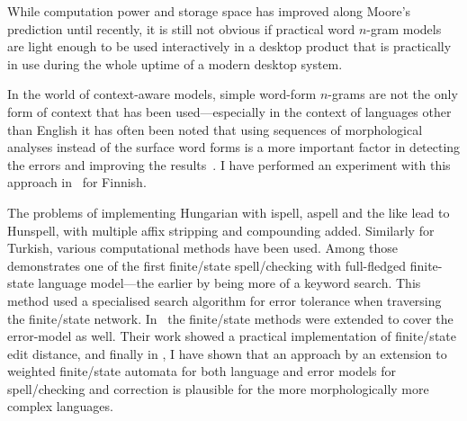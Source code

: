 \documentclass[officiallayout]{unihelcompling}
\begin{document}
While computation power and storage space has improved along Moore's
prediction until recently, it is still not obvious if practical word \(n\)-gram
models are light enough to be used interactively in a desktop product that is
practically in use during the whole uptime of a modern desktop system.

In the world of context-aware models, simple word-form \(n\)-grams are not the only
form of context that has been used---especially in the context of languages
other than English it has often been noted that using sequences of
morphological analyses instead of the surface word forms is a more important
factor in detecting the errors and improving the results~\citet[for
Spanish]{otero2007contextual}. I have performed an experiment with this
approach in~ for Finnish.

The problems of implementing Hungarian with ispell, aspell and the like lead to
Hunspell, with multiple affix stripping and compounding added. Similarly for
Turkish, various computational methods have been used. Among
those~\citet{oflazer1996errortolerant} demonstrates one of the first
finite\-/state spell\-/checking with full-fledged finite-state language
model---the earlier by \citet{aho1975efficient} being more of a keyword search.
This method used a specialised search algorithm for error tolerance when
traversing the finite\-/state network.  In~\citet{agata2002typographical} the
finite\-/state methods were extended to cover the error-model as well. Their work
showed a practical implementation of finite\-/state edit distance, and finally in
, I have shown that an approach by an
extension to weighted finite\-/state automata for both language and error models
for spell\-/checking and correction is plausible for the more morphologically
more complex languages.

\end{document}
